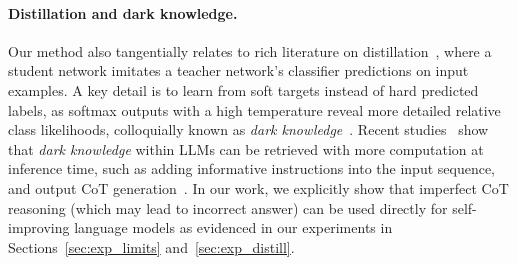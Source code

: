 \paragraph{Distillation and dark knowledge.} Our method also tangentially relates to rich literature on distillation~\citep{ba2014deep,hinton2015distilling}, where a student network imitates a teacher network's classifier predictions on input examples. A key detail is to learn from soft targets instead of hard predicted labels, as softmax outputs with a high temperature reveal more detailed relative class likelihoods, colloquially known as \textit{dark knowledge}~\citep{hinton2015distilling,korattikara2015bayesian}. Recent studies~\citep{star,snell2022learning,eisenstein2022honest} show that \textit{dark knowledge} within LLMs can be retrieved with more computation at inference time, such as adding informative instructions into the input sequence, and output CoT generation~\citep{Wei2022ChainOT,step_by_step}. In our work, we explicitly show that imperfect CoT reasoning (which may lead to incorrect answer) can be used directly for self-improving language models as evidenced in our experiments in Sections~\ref{sec:exp_limits} and~\ref{sec:exp_distill}.